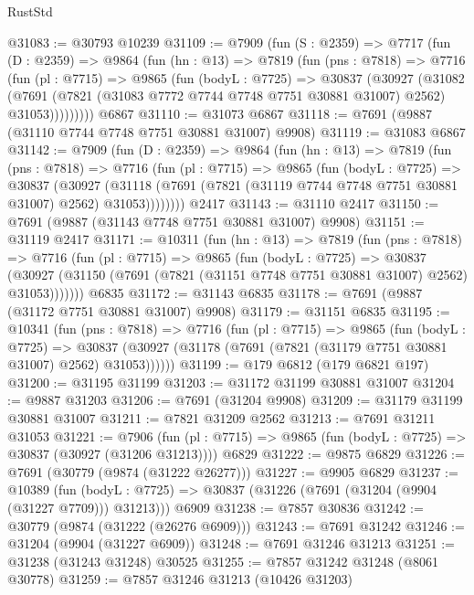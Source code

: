 \begin{lexlean}{RustStd}
\begin{coremodule}
@31083 := @30793 @10239
@31109 := @7909
    (fun (S : @2359) =>
    @7717
      (fun (D : @2359) =>
      @9864
        (fun (hn : @13) =>
        @7819
          (fun (pns : @7818) =>
          @7716
            (fun (pl : @7715) =>
            @9865
              (fun (bodyL : @7725) =>
              @30837
                (@30927
                  (@31082
                    (@7691
                      (@7821 (@31083 @7772 @7744 @7748 @7751 @30881 @31007) @2562)
                      @31053)))))))))
    @6867
@31110 := @31073 @6867
@31118 := @7691 (@9887 (@31110 @7744 @7748 @7751 @30881 @31007) @9908)
@31119 := @31083 @6867
@31142 := @7909
    (fun (D : @2359) =>
    @9864
      (fun (hn : @13) =>
      @7819
        (fun (pns : @7818) =>
        @7716
          (fun (pl : @7715) =>
          @9865
            (fun (bodyL : @7725) =>
            @30837
              (@30927
                (@31118 (@7691 (@7821 (@31119 @7744 @7748 @7751 @30881 @31007) @2562) @31053))))))))
    @2417
@31143 := @31110 @2417
@31150 := @7691 (@9887 (@31143 @7748 @7751 @30881 @31007) @9908)
@31151 := @31119 @2417
@31171 := @10311
    (fun (hn : @13) =>
    @7819
      (fun (pns : @7818) =>
      @7716
        (fun (pl : @7715) =>
        @9865
          (fun (bodyL : @7725) =>
          @30837
            (@30927 (@31150 (@7691 (@7821 (@31151 @7748 @7751 @30881 @31007) @2562) @31053)))))))
    @6835
@31172 := @31143 @6835
@31178 := @7691 (@9887 (@31172 @7751 @30881 @31007) @9908)
@31179 := @31151 @6835
@31195 := @10341
    (fun (pns : @7818) =>
    @7716
      (fun (pl : @7715) =>
      @9865
        (fun (bodyL : @7725) =>
        @30837 (@30927 (@31178 (@7691 (@7821 (@31179 @7751 @30881 @31007) @2562) @31053))))))
@31199 := @179 @6812 (@179 @6821 @197)
@31200 := @31195 @31199
@31203 := @31172 @31199 @30881 @31007
@31204 := @9887 @31203
@31206 := @7691 (@31204 @9908)
@31209 := @31179 @31199 @30881 @31007
@31211 := @7821 @31209 @2562
@31213 := @7691 @31211 @31053
@31221 := @7906
    (fun (pl : @7715) => @9865 (fun (bodyL : @7725) => @30837 (@30927 (@31206 @31213))))
    @6829
@31222 := @9875 @6829
@31226 := @7691 (@30779 (@9874 (@31222 @26277)))
@31227 := @9905 @6829
@31237 := @10389
    (fun (bodyL : @7725) => @30837 (@31226 (@7691 (@31204 (@9904 (@31227 @7709))) @31213)))
    @6909
@31238 := @7857 @30836
@31242 := @30779 (@9874 (@31222 (@26276 @6909)))
@31243 := @7691 @31242
@31246 := @31204 (@9904 (@31227 @6909))
@31248 := @7691 @31246 @31213
@31251 := @31238 (@31243 @31248) @30525
@31255 := @7857 @31242 @31248 (@8061 @30778)
@31259 := @7857 @31246 @31213 (@10426 @31203)

\end{coremodule}
\end{lexlean}
